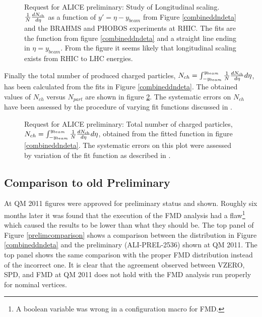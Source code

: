 \documentclass[11pt]{article}
\begin{document}
\begin{figure}
  \centering
  \caption{Request for ALICE preliminary: Study of Longitudinal
    scaling. $\dndeta$ as a function of $y'=\eta-y_{beam}$ from Figure
    \ref{combineddndeta} and the BRAHMS\cite{Bearden:2001qq} and
    PHOBOS\cite{Alver:2010ck} experiments at RHIC. The fits are the
    function from figure \ref{combineddndeta} and a straight line
    ending in $\eta=y_{beam}$. From the figure it seems likely that
    longitudinal scaling exists from RHIC to LHC energies.}
  \label{longscaling}
\end{figure} 

Finally the total number of produced charged particles,
$N_{ch}=\int^{y_{beam}}_{-y_{beam}}\dndeta d\eta$, has
been calculated from the fits in Figure \ref{combineddndeta}. The
obtained values of $N_{ch}$ versus $N_{part}$ are shown in figure
\ref{totalNch}. The systematic errors on $N_{ch}$ have been assessed
by the procedure of varying fit functions discussed in \cite{maxime}.

\begin{figure}
  \centering
  \caption{Request for ALICE preliminary: Total number of charged
    particles, $N_{ch}=\int^{y_{beam}}_{-y_{beam}}\dndeta d\eta$,
    obtained from the fitted function in figure
    \ref{combineddndeta}. The systematic errors on this plot were
    assessed by variation of the fit function as described in \cite{maxime}.}
  \label{totalNch}
\end{figure} 

\subsection{Comparison to old Preliminary}

At QM 2011 figures were approved for preliminary status and
shown. Roughly six months later it was found that the execution of the
FMD analysis had a flaw\footnote{A boolean variable was wrong in a
  configuration macro for FMD.} which caused the results to be lower
than what they should be. The top panel of Figure
\ref{prelimcomparison} shows a comparison between the distribution in
Figure \ref{combineddndeta} and the preliminary (ALI-PREL-2536) shown
at QM 2011. The top panel shows the same comparison with the proper
FMD distribution instead of the incorrect one. It is clear that the
agreement observed between VZERO, SPD, and FMD at QM 2011 does not
hold with the FMD analysis run properly for nominal vertices.
\end{document}
